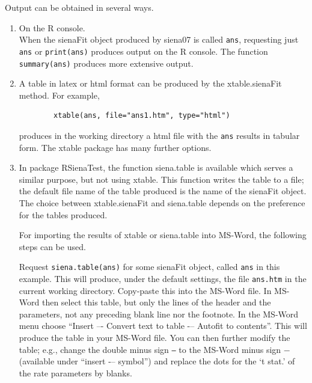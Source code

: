 \documentclass[a4paper,fleqn,11pt]{article}
\newcommand{\+}{\, + \,}
\newcommand{\sfn}[1]{\textsf{#1}}
\newcommand{\R}{{\sf R }}
\begin{document}
Output can be obtained in several ways.
\begin{enumerate}
  \item On the \R console.\\
        When the \textsf{sienaFit} object produced by \textsf{siena07}
        is called \texttt{ans},
        requesting just \texttt{ans} or \texttt{print(ans)}
        produces output on the \R console. The function
        \texttt{summary(ans)} produces more extensive output.
  \item A table in latex or html format can be produced by the
        \textsf{xtable.sienaFit} method.
        For example,
        \begin{verbatim}
        xtable(ans, file="ans1.htm", type="html")
        \end{verbatim}
        produces in the working directory a html file with the \texttt{ans}
        results in
        tabular form. The \textsf{xtable} package has many further options.\\
  \item In package \sfn{RSienaTest}, the function \sfn{siena.table}
        is available which serves a similar purpose,
        but not using \textsf{xtable}.
        This function writes the table to a file;
        the default file name of the table produced is the name of the
        \sfn{sienaFit} object.
        The choice between \textsf{xtable.sienaFit} and \sfn{siena.table}
        depends on the preference for the tables produced.

        For importing the results of \sfn{xtable} or \sfn{siena.table} into
        MS-Word, the following steps can be used.

        Request \texttt{siena.table(ans)} for some \sfn{sienaFit} object,
        called \texttt{ans} in this example. This will produce,
        under the default settings, the file \texttt{ans.htm} in the current
        working directory.
        Copy-paste this into the MS-Word file.
        In MS-Word then select this table, but
        only the lines of the header and the parameters, not any
        preceding blank line nor the footnote.
        In the MS-Word menu choose ``Insert –- Convert text to table -–
        Autofit to contents''.
        This will produce the table in your MS-Word file.
        You can then further modify the table; e.g., change the double minus
        sign \texttt{--} to the MS-Word minus sign $ - $
        (available under ``insert -– symbol'') and replace the dots for the
        `t stat.' of the rate parameters by blanks.


\end{enumerate}
\end{document}
